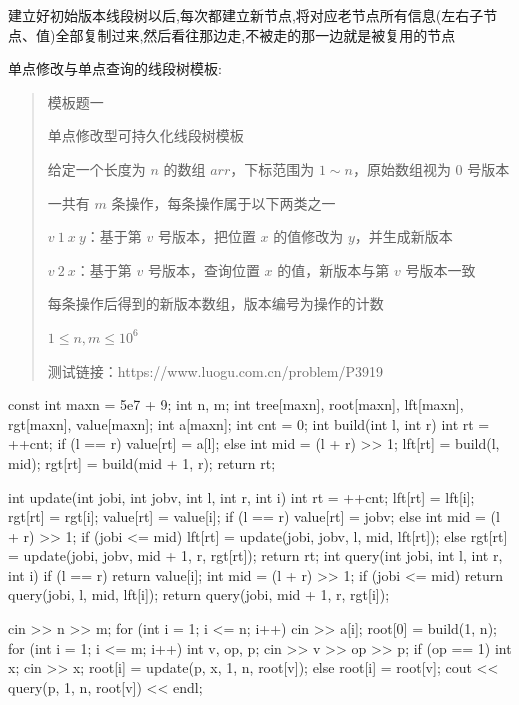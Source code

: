 \documentclass[UTF8,a4paper,11pt]{ctexart}
\begin{document}
建立好初始版本线段树以后,每次都建立新节点,将对应老节点所有信息(左右子节点、值)全部复制过来,然后看往那边走,不被走的那一边就是被复用的节点

单点修改与单点查询的线段树模板:

\begin{quote}
模板题一\par
单点修改型可持久化线段树模板\par
给定一个长度为 $n$ 的数组 $arr$，下标范围为 $1 \sim n$，原始数组视为 0 号版本\par
一共有 $m$ 条操作，每条操作属于以下两类之一\par
$v\ 1\ x\ y$：基于第 $v$ 号版本，把位置 $x$ 的值修改为 $y$，并生成新版本\par
$v\ 2\ x$：基于第 $v$ 号版本，查询位置 $x$ 的值，新版本与第 $v$ 号版本一致\par
每条操作后得到的新版本数组，版本编号为操作的计数\par
$1 \le n,m \le 10^6$\par
测试链接：https://www.luogu.com.cn/problem/P3919\par
\end{quote}

\begin{CodeBlock}
const int maxn = 5e7 + 9;
int n, m;
int tree[maxn], root[maxn], lft[maxn], rgt[maxn], value[maxn];
int a[maxn];
int cnt = 0;
int build(int l, int r) {
    int rt = ++cnt;
    if (l == r) {
        value[rt] = a[l];
    } else {
        int mid = (l + r) >> 1;
        lft[rt] = build(l, mid);
        rgt[rt] = build(mid + 1, r);
    }
    return rt;
}
\end{CodeBlock}

\begin{CodeBlock}
int update(int jobi, int jobv, int l, int r, int i) {
    int rt = ++cnt;
    lft[rt] = lft[i];
    rgt[rt] = rgt[i];
    value[rt] = value[i];
    if (l == r) {
        value[rt] = jobv;
    } else {
        int mid = (l + r) >> 1;
        if (jobi <= mid)
            lft[rt] = update(jobi, jobv, l, mid, lft[rt]);
        else
            rgt[rt] = update(jobi, jobv, mid + 1, r, rgt[rt]);
    }
    return rt;
}
int query(int jobi, int l, int r, int i) {
    if (l == r)
        return value[i];
    int mid = (l + r) >> 1;
    if (jobi <= mid)
        return query(jobi, l, mid, lft[i]);
    return query(jobi, mid + 1, r, rgt[i]);
}
\end{CodeBlock}

\begin{CodeBlock}
cin >> n >> m;
for (int i = 1; i <= n; i++)
    cin >> a[i];
root[0] = build(1, n);
for (int i = 1; i <= m; i++) {
    int v, op, p;
    cin >> v >> op >> p;
    if (op == 1) {
        int x;
        cin >> x;
        root[i] = update(p, x, 1, n, root[v]);
    } else {
        root[i] = root[v];
        cout << query(p, 1, n, root[v]) << endl;
    }
}
\end{CodeBlock}
\end{document}
